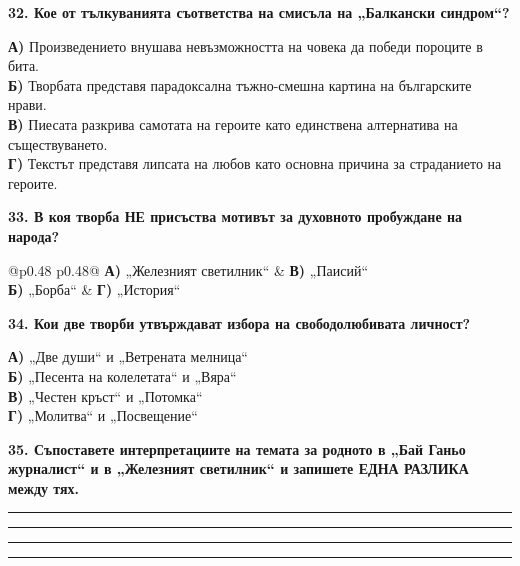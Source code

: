 \documentclass[12pt,a4paper]{article}
\begin{document}
\vspace{0.6cm}

\noindent
\textbf{32. Кое от тълкуванията съответства на смисъла на „Балкански синдром“?}

\vspace{0.2cm}

\noindent
\textbf{А)} Произведението внушава невъзможността на човека да победи пороците в бита.
\\
\noindent
\textbf{Б)} Творбата представя парадоксална тъжно-смешна картина на българските нрави.
\\
\noindent
\textbf{В)} Пиесата разкрива самотата на героите като единствена алтернатива на съществуването.
\\
\noindent
\textbf{Г)} Текстът представя липсата на любов като основна причина за страданието на героите.

\vspace{0.6cm}

\noindent
\textbf{33. В коя творба НЕ присъства мотивът за духовното пробуждане на народа?}

\vspace{0.2cm}

\noindent
\begin{tabular}{@{}p{0.48\textwidth} p{0.48\textwidth}@{}}
\textbf{А)} „Железният светилник“ & \textbf{В)} „Паисий“ \\
\textbf{Б)} „Борба“ & \textbf{Г)} „История“
\end{tabular}

\vspace{0.6cm}

\noindent
\textbf{34. Кои две творби утвърждават избора на свободолюбивата личност?}

\vspace{0.2cm}

\noindent
\textbf{А)} „Две души“ и „Ветрената мелница“
\\
\noindent
\textbf{Б)} „Песента на колелетата“ и „Вяра“
\\
\noindent
\textbf{В)} „Честен кръст“ и „Потомка“
\\
\noindent
\textbf{Г)} „Молитва“ и „Посвещение“

\vspace{0.6cm}

\noindent
\textbf{35. Съпоставете интерпретациите на темата за родното в „Бай Ганьо журналист“ и в „Железният светилник“ и запишете ЕДНА РАЗЛИКА между тях.}

\vspace{0.2cm}
\noindent\rule{\linewidth}{0.4pt}
\noindent\rule{\linewidth}{0.4pt}
\noindent\rule{\linewidth}{0.4pt}
\noindent\rule{\linewidth}{0.4pt}
\end{document}
